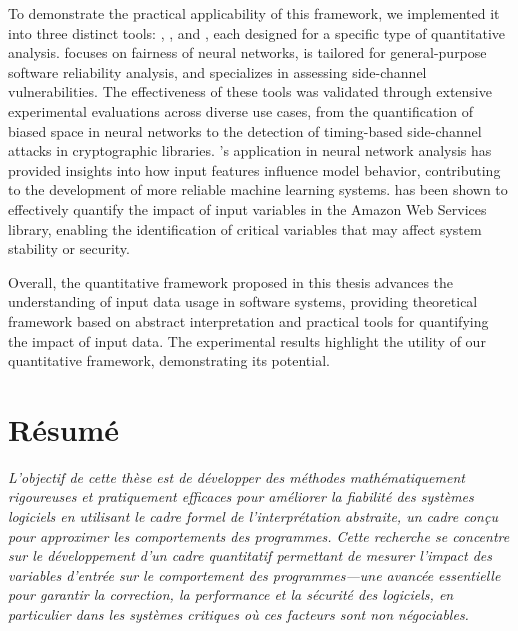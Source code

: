 To demonstrate the practical applicability of this framework, we implemented it into three distinct tools: \libra, \impatto, and \timesec, each designed for a specific type of quantitative analysis. \libra{} focuses on fairness of neural networks, \impatto{} is tailored for general-purpose software reliability analysis, and \timesec{} specializes in assessing side-channel vulnerabilities. The effectiveness of these tools was validated through extensive experimental evaluations across diverse use cases, from the quantification of biased space in neural networks to the detection of timing-based side-channel attacks in cryptographic libraries.
\libra's application in neural network analysis has provided insights into how input features influence model behavior, contributing to the development of more reliable machine learning systems.
\timesec{} has been shown to effectively quantify the impact of input variables in the Amazon Web Services \bignum{} library, enabling the identification of critical variables that may affect system stability or security.

Overall, the quantitative framework proposed in this thesis advances the understanding of input data usage in software systems, providing theoretical framework based on abstract interpretation and practical tools for quantifying the impact of input data. The experimental results highlight the utility of our quantitative framework, demonstrating its potential.


\chapter*{Résumé}

\emph{L'objectif de cette thèse est de développer des méthodes mathématiquement rigoureuses et pratiquement efficaces pour améliorer la fiabilité des systèmes logiciels en utilisant le cadre formel de l'interprétation abstraite, un cadre conçu pour approximer les comportements des programmes. Cette recherche se concentre sur le développement d'un cadre quantitatif permettant de mesurer l'impact des variables d'entrée sur le comportement des programmes—une avancée essentielle pour garantir la correction, la performance et la sécurité des logiciels, en particulier dans les systèmes critiques où ces facteurs sont non négociables.}

